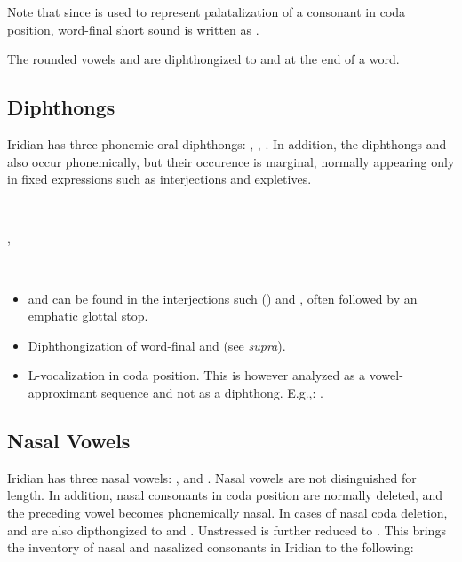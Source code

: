Note that since  is used to represent palatalization of a consonant in coda position, word-final short  sound is written as .

The rounded vowels  and \bt{\oe~\o:} are diphthongized to  and  at the end of a word.

\subsection{Diphthongs}
Iridian has three phonemic oral diphthongs:  ,  \nt{\dte},  \nt{\dto}. In addition, the diphthongs   and   also occur phonemically, but their occurence is marginal, normally appearing only in fixed expressions such as interjections and expletives.

\ex
{} \\
\xe

\ex
{}, \\
\xe


\ex
{} \\
\xe

\begin{itemize}
	\item {} and  can be found in the interjections such   () and   , often followed by an emphatic glottal stop.
	\item Diphthongization of word-final  and \nt{\oe~\o:} (see \textit{supra}).
	\item L-vocalization in coda position. This is however analyzed as a vowel-approximant sequence and not as a diphthong. E.g.,:   .
\end{itemize}

\subsection{Nasal Vowels}
Iridian has three nasal vowels:  ,   and  . Nasal vowels are not disinguished for length. In addition, nasal consonants in coda position are normally deleted, and the preceding vowel becomes phonemically nasal. In cases of nasal coda deletion,   and   are also dipthongized to  and . Unstressed  is further reduced to . This brings the inventory of nasal and nasalized consonants in Iridian to the following: 

